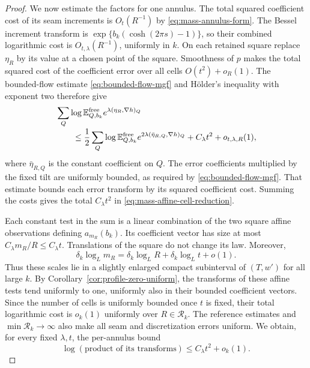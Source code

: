 \begin{proof}
We now estimate the factors for one annulus.  The total squared
coefficient cost of its seam increments is \(O_t(R^{-1})\) by
\eqref{eq:mass-annulus-form}.  The Bessel increment transform is
\(\exp\{b_k(\cosh(2\pi s)-1)\}\), so their combined logarithmic
cost is \(O_{t,\lambda}(R^{-1})\), uniformly in \(k\).
On each retained square replace \(\eta_R\) by its value at a
chosen point of the square.  Smoothness of \(p\) makes the total
squared cost of the coefficient error over all cells
\(O(t^2)+o_R(1)\).  The bounded-flow estimate \eqref{eq:bounded-flow-mgf} and
H\"older's inequality with exponent two therefore give
\begin{align}
 &\sum_Q\log\mathbb E_{Q,b_k}^{\rm free}
                  e^{\lambda(\eta_R,\nabla h)_Q}
 \notag\\[-2pt]
 &\qquad\le
 \frac12\sum_Q\log\mathbb E_{Q,b_k}^{\rm free}
                    e^{2\lambda(\bar\eta_{R,Q},\nabla h)_Q}
                       +C_\lambda t^2+o_{t,\lambda,R}(1),
 \label{eq:mass-affine-cell-reduction}
\end{align}
where \(\bar\eta_{R,Q}\) is the constant coefficient on \(Q\).
The error coefficients multiplied by the fixed tilt are uniformly
bounded, as required by \eqref{eq:bounded-flow-mgf}.  That estimate
bounds each error transform by its squared coefficient cost.
Summing the costs gives the total \(C_\lambda t^2\) in
\eqref{eq:mass-affine-cell-reduction}.

Each constant test in the sum is a linear combination of the two
square affine observations defining \(a_{m_R}(b_k)\).  Its
coefficient vector has size at most \(C_\lambda m_R/R\le C_\lambda t\).
Translations of the square do not change its law.  Moreover,
\[
       \delta_k\log_Lm_R
            =\delta_k\log_LR+\delta_k\log_Lt+o(1).
\]
Thus these scales lie in a slightly enlarged compact subinterval
of \((T,w')\) for all large \(k\).  By
Corollary~\ref{cor:profile-zero-uniform}, the transforms of these
affine tests tend uniformly to one, uniformly also in their
bounded coefficient vectors.  Since the number of cells is uniformly bounded
once \(t\) is fixed, their total logarithmic cost is \(o_k(1)\)
uniformly over \(R\in\mathcal R_k\).
The reference estimates and \(\min\mathcal R_k\to\infty\) also
make all seam and discretization errors uniform.  We obtain,
for every fixed \(\lambda,t\), the per-annulus bound
\begin{equation}\label{eq:mass-annulus-cost}
           \log(\text{product of its transforms})
                             \le C_\lambda t^2+o_k(1).
\end{equation}


\end{proof}
